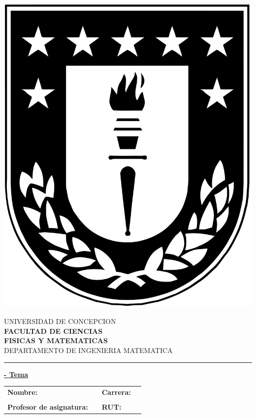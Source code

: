 \thispagestyle{empty}

\begin{minipage}{0.12\textwidth}
\includegraphics[width=\textwidth]{./img/logoudec.jpg}
\end{minipage}
\hspace{5mm}
\begin{minipage}{0.9\textwidth}
UNIVERSIDAD DE CONCEPCION\\
{\small\small\bf 
FACULTAD DE CIENCIAS\\ 
FISICAS Y MATEMATICAS}\\
DEPARTAMENTO DE INGENIERIA MATEMATICA\\
\rule{0.88\textwidth}{.5pt} %
\end{minipage}

\vspace*{0.5cm} \centerline {\bf\underline{\titulo - Tema \print{\thetemaCounter}}}
\centerline{\textrm{\fecha}}  \vspace{0.2cm}

\begin{centering}
\begin{tabular}{lp{}lp{}}
\textbf{Nombre:} 	& &\textbf{Carrera:}	& \\ \\
\textbf{Profesor de asignatura:}	& &\textbf{ RUT:}		&
\end{tabular}
\end{centering}

